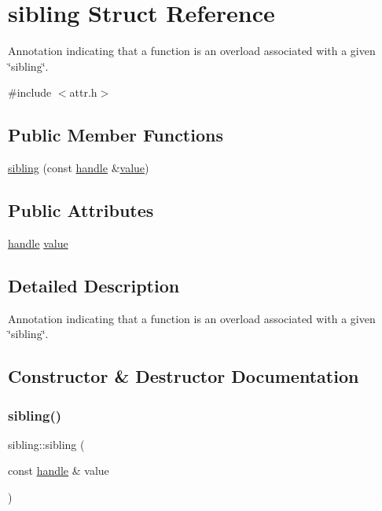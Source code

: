 \hypertarget{structsibling}{}\section{sibling Struct Reference}
\label{structsibling}


Annotation indicating that a function is an overload associated with a given \char`\"{}sibling\char`\"{}.  




{\ttfamily \#include $<$attr.\+h$>$}

\subsection*{Public Member Functions}
\begin{DoxyCompactItemize}
\item 
\mbox{\hyperlink{structsibling_a5fdaa9f632856bc0c8f8c18c14c48320}{sibling}} (const \mbox{\hyperlink{classhandle}{handle}} \&\mbox{\hyperlink{_s_d_l__opengl__glext_8h_a8ad81492d410ff2ac11f754f4042150f}{value}})
\end{DoxyCompactItemize}
\subsection*{Public Attributes}
\begin{DoxyCompactItemize}
\item 
\mbox{\hyperlink{classhandle}{handle}} \mbox{\hyperlink{structsibling_a3e9e0ab053e64c98c3baf8e81572df97}{value}}
\end{DoxyCompactItemize}


\subsection{Detailed Description}
Annotation indicating that a function is an overload associated with a given \char`\"{}sibling\char`\"{}. 

\subsection{Constructor \& Destructor Documentation}
\mbox{\label{structsibling_a5fdaa9f632856bc0c8f8c18c14c48320}} 
\subsubsection{\texorpdfstring{sibling()}{sibling()}}
{\footnotesize\ttfamily sibling\+::sibling (\begin{DoxyParamCaption}\item[{const \mbox{\hyperlink{classhandle}{handle}} \&}]{value }\end{DoxyParamCaption})\hspace{0.3cm}{\ttfamily [inline]}}



